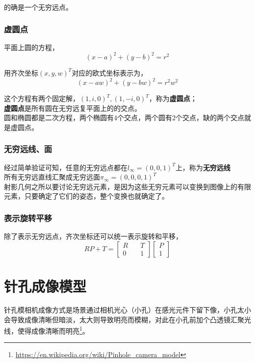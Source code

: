 \documentclass[hpyerref,UTF8,a4paper,titlepage,12pt,oneside]{ctexbook}
\theoremstyle{definition}
\begin{document}
		的确是一个无穷远点。

	\subsubsection*{虚圆点}		

		平面上圆的方程，
		$$
			(x - a)^2 + (y - b)^2 = r^2
		$$

		用齐次坐标$(x,y,w)^T$对应的欧式坐标表示为，
		$$
			(x - aw)^2 + (y - bw)^2 = r^2w^2
		$$

		这个方程有两个固定解，$(1,i,0)^T, (1,-i,0)^T$，称为\textbf{虚圆点}；\\

		\textbf{虚圆点}是所有圆在无穷远复平面上的的交点。\\

		圆和椭圆都是二次方程，两个椭圆有4个交点，两个圆有2个交点，缺的两个交点就是虚圆点。

	\subsubsection*{无穷远线、面}
		经过简单验证可知，任意的无穷远点都在$l_{\infty} = (0,0,1)^T$上，称为\textbf{无穷远线}\\

		所有无穷远直线汇聚成无穷远面$\pi_{\infty} = (0,0,0,1)^T$\\

		射影几何之所以要讨论无穷远元素，是因为这些无穷元素可以变换到图像上的有限元素，只要确定了它们的姿态，整个变换也就确定了。

	\subsubsection*{表示旋转平移}
	 除了表示无穷远点，齐次坐标还可以统一表示旋转和平移，
	 $$
	 	RP +T = \begin{bmatrix}
	 		R \quad& T\\
	 		0 \quad& 1
	 	\end{bmatrix}
	 	\begin{bmatrix}
	 		P\\
	 		1
	 	\end{bmatrix}
	 $$

\section{针孔成像模型}
	针孔模相机成像方式是场景通过相机光心（小孔）在感光元件下留下像，小孔太小会导致成像清晰但暗淡，太大则导致明亮而模糊，对此在小孔前加个凸透镜汇聚光线，使得成像清晰而明亮\footnote{\url{https://en.wikipedia.org/wiki/Pinhole_camera_model}}。
\end{document}
